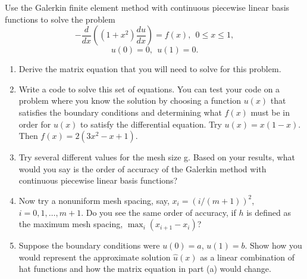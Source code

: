 \documentclass[10pt]{article}
\begin{document}
\maketitle



\begin{problem}
Use the Galerkin finite element method with continuous piecewise linear basis functions to solve the problem
\[ - \frac{d}{dx} \left( (1 + x^2 ) \frac{du}{dx} \right) = f(x) ,~~0 \leq x \leq 1, \]
\[ u(0) = 0,~~u(1) = 0 .\]
\begin{enumerate}[label=(\alph*)]
	\item Derive the matrix equation that you will need to solve for this problem.
	\item Write a code to solve this set of equations.  You can test your code on a problem where you know the solution by choosing a function \( u(x) \) that satisfies the boundary conditions and determining what \( f(x) \) must be in order for \( u(x) \) to satisfy the differential equation. Try \( u(x) = x(1-x) \).  Then \( f(x) = 2(3 x^2 -x + 1) \).
	\item Try several different values for the mesh size g.  Based on your results, what would you say is the order of accuracy of the Galerkin method with continuous piecewise linear basis functions?
	\item Now try a nonuniform mesh spacing, say, \( x_i = (i/(m+1) )^2 \), \( i=0,1, \ldots , m+1 \).  Do you see the same order of accuracy, if \( h \) is defined as the maximum mesh spacing, \( \max_i ( x_{i+1} - x_i ) \)?
    \item Suppose the boundary conditions were \( u(0) = a \), \( u(1) = b \).  Show how you would represent the approximate solution \( \hat{u} (x) \) as a linear combination of hat functions and how the matrix equation in part (a) would change.
\end{enumerate}
\end{problem}
\end{document}
